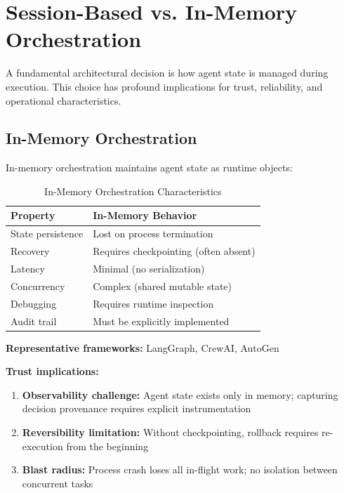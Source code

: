 \section{Session-Based vs. In-Memory Orchestration}
\label{sec:session-vs-inmemory}

A fundamental architectural decision is how agent state is managed during execution. This choice has profound implications for trust, reliability, and operational characteristics.

\subsection{In-Memory Orchestration}
\label{subsec:inmemory-orchestration}

In-memory orchestration maintains agent state as runtime objects:

\begin{table}[htbp]
\centering
\caption{In-Memory Orchestration Characteristics}
\label{tab:inmemory-characteristics}
\begin{tabular}{ll}
\toprule
\textbf{Property} & \textbf{In-Memory Behavior} \\
\midrule
State persistence & Lost on process termination \\
Recovery & Requires checkpointing (often absent) \\
Latency & Minimal (no serialization) \\
Concurrency & Complex (shared mutable state) \\
Debugging & Requires runtime inspection \\
Audit trail & Must be explicitly implemented \\
\bottomrule
\end{tabular}
\end{table}

\textbf{Representative frameworks:} LangGraph, CrewAI, AutoGen

\textbf{Trust implications:}
\begin{enumerate}
    \item \textbf{Observability challenge:} Agent state exists only in memory; capturing decision provenance requires explicit instrumentation
    \item \textbf{Reversibility limitation:} Without checkpointing, rollback requires re-execution from the beginning
    \item \textbf{Blast radius:} Process crash loses all in-flight work; no isolation between concurrent tasks
\end{enumerate}

